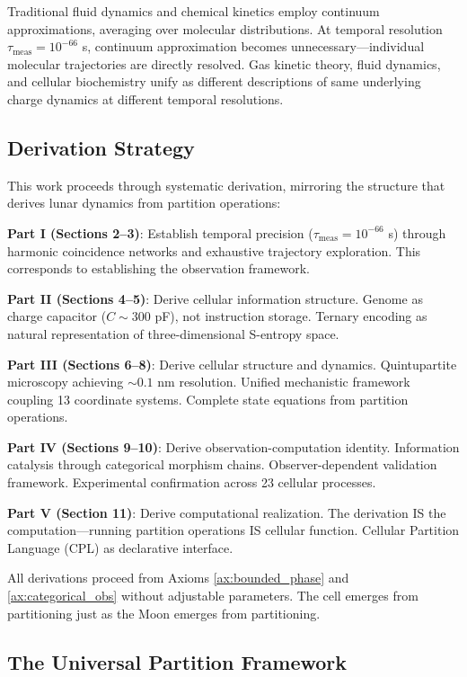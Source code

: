 \documentclass[11pt,a4paper]{article}
\theoremstyle{remark}
\begin{document}
Traditional fluid dynamics and chemical kinetics employ continuum approximations, averaging over molecular distributions. At temporal resolution $\tau_{\text{meas}} = 10^{-66}$ s, continuum approximation becomes unnecessary—individual molecular trajectories are directly resolved. Gas kinetic theory, fluid dynamics, and cellular biochemistry unify as different descriptions of same underlying charge dynamics at different temporal resolutions.

\subsection{Derivation Strategy}

This work proceeds through systematic derivation, mirroring the structure that derives lunar dynamics from partition operations:

\textbf{Part I (Sections 2--3)}: Establish temporal precision ($\tau_{\text{meas}} = 10^{-66}$ s) through harmonic coincidence networks and exhaustive trajectory exploration. This corresponds to establishing the observation framework.

\textbf{Part II (Sections 4--5)}: Derive cellular information structure. Genome as charge capacitor ($C \sim 300$ pF), not instruction storage. Ternary encoding as natural representation of three-dimensional S-entropy space.

\textbf{Part III (Sections 6--8)}: Derive cellular structure and dynamics. Quintupartite microscopy achieving $\sim 0.1$ nm resolution. Unified mechanistic framework coupling 13 coordinate systems. Complete state equations from partition operations.

\textbf{Part IV (Sections 9--10)}: Derive observation-computation identity. Information catalysis through categorical morphism chains. Observer-dependent validation framework. Experimental confirmation across 23 cellular processes.

\textbf{Part V (Section 11)}: Derive computational realization. The derivation IS the computation---running partition operations IS cellular function. Cellular Partition Language (CPL) as declarative interface.

All derivations proceed from Axioms \ref{ax:bounded_phase} and \ref{ax:categorical_obs} without adjustable parameters. The cell emerges from partitioning just as the Moon emerges from partitioning.

\subsection{The Universal Partition Framework}
\end{document}
